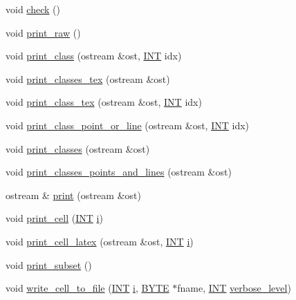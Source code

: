 \begin{DoxyCompactItemize}
\item 
void \mbox{\hyperlink{classpartitionstack_a30ab45463af6dbfc8e46314ff03624ae}{check}} ()
\item 
void \mbox{\hyperlink{classpartitionstack_a733493f93dd83b5cef67908fc42a4312}{print\+\_\+raw}} ()
\item 
void \mbox{\hyperlink{classpartitionstack_a7dbde570bd374f43293acbcafb574e9a}{print\+\_\+class}} (ostream \&ost, \mbox{\hyperlink{galois_8h_a09fddde158a3a20bd2dcadb609de11dc}{I\+NT}} idx)
\item 
void \mbox{\hyperlink{classpartitionstack_a6c8017515af2796678a4bea3ee6d49a8}{print\+\_\+classes\+\_\+tex}} (ostream \&ost)
\item 
void \mbox{\hyperlink{classpartitionstack_addca7119abc7b13416ce0e50155ba2de}{print\+\_\+class\+\_\+tex}} (ostream \&ost, \mbox{\hyperlink{galois_8h_a09fddde158a3a20bd2dcadb609de11dc}{I\+NT}} idx)
\item 
void \mbox{\hyperlink{classpartitionstack_adea8d0eebaf0b53a74f2fcdf1e63e31d}{print\+\_\+class\+\_\+point\+\_\+or\+\_\+line}} (ostream \&ost, \mbox{\hyperlink{galois_8h_a09fddde158a3a20bd2dcadb609de11dc}{I\+NT}} idx)
\item 
void \mbox{\hyperlink{classpartitionstack_a4402fb4ff1f6c91590899814cf91438c}{print\+\_\+classes}} (ostream \&ost)
\item 
void \mbox{\hyperlink{classpartitionstack_aaed3f1a7bffbbdaf5fa9d20ef86b87b1}{print\+\_\+classes\+\_\+points\+\_\+and\+\_\+lines}} (ostream \&ost)
\item 
ostream \& \mbox{\hyperlink{classpartitionstack_aabacee6e58ddb0d6ee46a47f714edfbb}{print}} (ostream \&ost)
\item 
void \mbox{\hyperlink{classpartitionstack_a0d68f289279350ec3f7e23ca8ab6cbcf}{print\+\_\+cell}} (\mbox{\hyperlink{galois_8h_a09fddde158a3a20bd2dcadb609de11dc}{I\+NT}} \mbox{\hyperlink{alphabet2_8_c_acb559820d9ca11295b4500f179ef6392}{i}})
\item 
void \mbox{\hyperlink{classpartitionstack_a30a6185551bee04fae150a639978440a}{print\+\_\+cell\+\_\+latex}} (ostream \&ost, \mbox{\hyperlink{galois_8h_a09fddde158a3a20bd2dcadb609de11dc}{I\+NT}} \mbox{\hyperlink{alphabet2_8_c_acb559820d9ca11295b4500f179ef6392}{i}})
\item 
void \mbox{\hyperlink{classpartitionstack_a098714bf14613bfd7feebde5f28474ed}{print\+\_\+subset}} ()
\item 
void \mbox{\hyperlink{classpartitionstack_a8a9af82af9d5264589ec60792757901d}{write\+\_\+cell\+\_\+to\+\_\+file}} (\mbox{\hyperlink{galois_8h_a09fddde158a3a20bd2dcadb609de11dc}{I\+NT}} \mbox{\hyperlink{alphabet2_8_c_acb559820d9ca11295b4500f179ef6392}{i}}, \mbox{\hyperlink{galois_8h_ab6cc7b4aeb6ea31aba2b3fbfc83ff5e6}{B\+Y\+TE}} $\ast$fname, \mbox{\hyperlink{galois_8h_a09fddde158a3a20bd2dcadb609de11dc}{I\+NT}} \mbox{\hyperlink{simeon_8_c_a818073fbcc2f439e7c56952f67386122}{verbose\+\_\+level}})

\end{DoxyCompactItemize}
